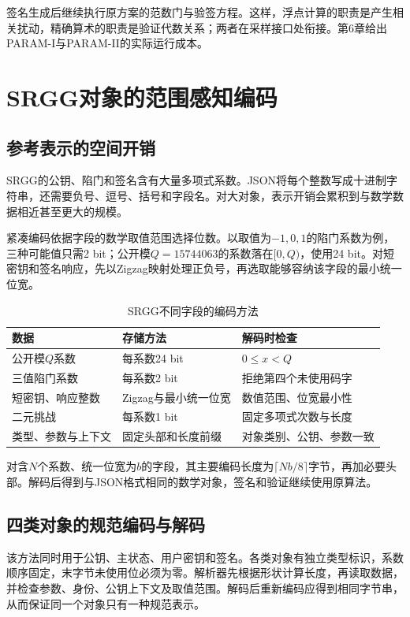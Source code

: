 签名生成后继续执行原方案的范数门与验签方程。这样，浮点计算的职责是产生相关扰动，精确算术的职责是验证代数关系；两者在采样接口处衔接。第6章给出PARAM-I与PARAM-II的实际运行成本。

\section{SRGG对象的范围感知编码}
\label{sec:srgg-codec}
\subsection{参考表示的空间开销}
SRGG的公钥、陷门和签名含有大量多项式系数。JSON将每个整数写成十进制字符串，还需要负号、逗号、括号和字段名。对大对象，表示开销会累积到与数学数据相近甚至更大的规模。

紧凑编码依据字段的数学取值范围选择位数。以取值为$-1,0,1$的陷门系数为例，三种可能值只需2 bit；公开模$Q=15744063$的系数落在$[0,Q)$，使用24 bit。对短密钥和签名响应，先以Zigzag映射处理正负号，再选取能够容纳该字段的最小统一位宽。

\begin{table}[H]
\centering\small
\caption{SRGG不同字段的编码方法}
\label{tab:codec-fields}
\begin{tabularx}{\textwidth}{@{}p{}p{}X@{}}
\toprule
\rowcolor{black!8} 数据 & 存储方法 & 解码时检查 \\
\midrule
公开模$Q$系数 & 每系数24 bit & $0\leq x<Q$ \\
三值陷门系数 & 每系数2 bit & 拒绝第四个未使用码字 \\
短密钥、响应整数 & Zigzag与最小统一位宽 & 数值范围、位宽最小性 \\
二元挑战 & 每系数1 bit & 固定多项式次数与长度 \\
类型、参数与上下文 & 固定头部和长度前缀 & 对象类别、公钥、参数一致 \\
\bottomrule
\end{tabularx}
\end{table}

对含$N$个系数、统一位宽为$b$的字段，其主要编码长度为$\lceil Nb/8\rceil$字节，再加必要头部。解码后得到与JSON格式相同的数学对象，签名和验证继续使用原算法。

\subsection{四类对象的规范编码与解码}
该方法同时用于公钥、主状态、用户密钥和签名。各类对象有独立类型标识，系数顺序固定，末字节未使用位必须为零。解析器先根据形状计算长度，再读取数据，并检查参数、身份、公钥上下文及取值范围。解码后重新编码应得到相同字节串，从而保证同一个对象只有一种规范表示。

